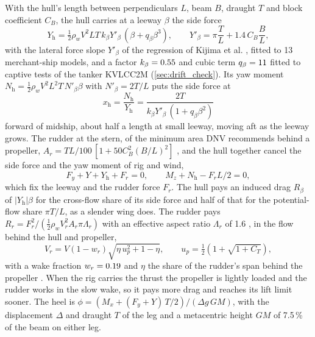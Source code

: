 With the hull's length between perpendiculars $L$, beam $B$, draught $T$ and block coefficient $C_B$, the hull carries at a leeway $\beta$ the side force
\begin{equation}
Y_\mathrm{h} = \tfrac12\rho_w V^2 L T\, k_\beta Y'_\beta\,(\beta + q_\beta\beta^3), \qquad Y'_\beta = \pi\frac{T}{L} + 1.4\,C_B\frac{B}{L},
\end{equation}
with the lateral force slope $Y'_\beta$ of the regression of Kijima et al. \citep{kim2021}, fitted to 13 merchant-ship models, and a factor $k_\beta=0.55$ and cubic term $q_\beta=11$ fitted to captive tests of the tanker KVLCC2M \citep{toxopeus2011} (\cref{sec:drift_check}). Its yaw moment $N_\mathrm{h} = \tfrac12\rho_w V^2 L^2 T\, N'_\beta\beta$ with $N'_\beta=2T/L$ puts the side force at
\begin{equation}
x_\mathrm{h} = \frac{N_\mathrm{h}}{Y_\mathrm{h}} = \frac{2T}{k_\beta Y'_\beta\,(1 + q_\beta\beta^2)}
\end{equation}
forward of midship, about half a length at small leeway, moving aft as the leeway grows. The rudder at the stern, of the minimum area DNV recommends behind a propeller, $A_r = TL/100\,[1+50C_B^2(B/L)^2]$ \citep{dnv_rudder}, and the hull together cancel the side force and the yaw moment of rig and wind,
\begin{equation}
F_y + Y + Y_\mathrm{h} + F_r = 0, \qquad M_z + N_\mathrm{h} - F_r L/2 = 0,
\end{equation}
which fix the leeway and the rudder force $F_r$. The hull pays an induced drag $R_\beta$ of $|Y_\mathrm{h}|\beta$ for the cross-flow share of its side force and half of that for the potential-flow share $\pi T/L$, as a slender wing does. The rudder pays $R_r=F_r^2/(\tfrac12\rho_w V_r^2 A_r \pi \Lambda_r)$ with an effective aspect ratio $\Lambda_r$ of 1.6 \citep{kramer2022}, in the flow behind the hull and propeller,
\begin{equation}
V_r = V(1-w_r)\sqrt{\eta\,u_p^2 + 1 - \eta}, \qquad u_p = \tfrac12\left(1 + \sqrt{1 + C_T}\right),
\end{equation}
with a wake fraction $w_r=0.19$ \citep{kramer2022} and $\eta$ the share of the rudder's span behind the propeller \citep{kramer2022b}. When the rig carries the thrust the propeller is lightly loaded and the rudder works in the slow wake, so it pays more drag and reaches its lift limit sooner. The heel is $\phi = (M_x + (F_y + Y)\,T/2)/(\Delta g\,GM)$, with the displacement $\Delta$ and draught $T$ of the leg and a metacentric height $GM$ of 7.5\,\% of the beam on either leg.

